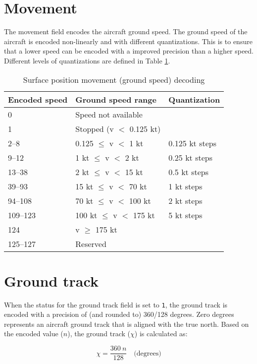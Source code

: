 \section{Movement}

The movement field encodes the aircraft ground speed. The ground speed of the aircraft is encoded non-linearly and with different quantizations. This is to ensure that a lower speed can be encoded with a improved precision than a higher speed. Different levels of quantizations are defined in Table \ref{tb:adsb-surf-pos-mov}.

\begin{table}[ht]
\caption{Surface position movement (ground speed) decoding}
\label{tb:adsb-surf-pos-mov}
\begin{tabular}{|l|l|l|}
\hline
\textbf{Encoded speed} & \textbf{Ground speed range} & \textbf{Quantization} \\ \hline
0 & Speed not available &  \\ \hline
1 & Stopped (v $<$ 0.125 kt) &  \\ \hline
2--8 & 0.125 $\leq$ v $<$ 1 kt & 0.125 kt steps \\ \hline
9--12 & 1 kt $\leq$ v $<$ 2 kt & 0.25 kt steps \\ \hline
13--38 & 2 kt $\leq$ v $<$ 15 kt & 0.5 kt steps \\ \hline
39--93 & 15 kt $\leq$ v $<$ 70 kt & 1 kt steps \\ \hline
94--108 & 70 kt $\leq$ v $<$ 100 kt & 2 kt steps \\ \hline
109--123 & 100 kt $\leq$ v $<$ 175 kt & 5 kt steps \\ \hline
124 & v $\ge$ 175 kt &  \\ \hline
125--127 & Reserved &  \\ \hline
\end{tabular}
\end{table}


\section{Ground track}

When the status for the ground track field is set to \texttt{1}, the ground track is encoded with a precision of (and rounded to) 360/128 degrees. Zero degrees represents an aircraft ground track that is aligned with the true north. Based on the encoded value ($n$), the ground track ($\chi$) is calculated as:

\begin{equation}
    \chi = \frac{360~n}{128} \quad \text{(degrees)}
\end{equation}


